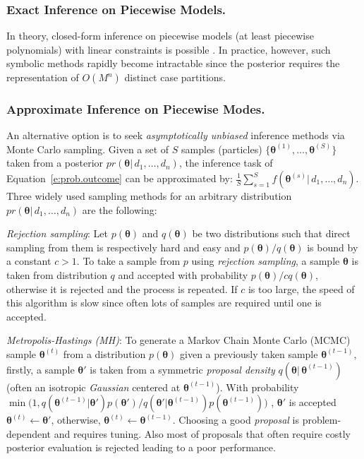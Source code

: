 \documentclass[letterpaper]{article}
\begin{document}
\subsubsection{Exact Inference on Piecewise Models.} In theory, closed-form inference on piecewise models (at least piecewise polynomials) with linear constraints is possible \cite{Sanner:12}.
In practice, however, such symbolic methods rapidly become intractable since the posterior requires
the representation of $O(M^n)$ distinct case partitions.
 
\subsubsection{Approximate Inference on Piecewise Modes.} 
An alternative option is to seek \emph{asymptotically unbiased} inference methods
via Monte Carlo sampling.
Given a set of $S$ samples (particles) $\{\boldsymbol\theta^{(1)}, \ldots, \boldsymbol\theta^{(S)}\}$ taken from a posterior $pr(\boldsymbol\theta | \, d_1, \ldots, d_n)$, 
the inference task of Equation~\ref{e:prob.outcome} can be approximated by: 
$\frac{1}{S} \sum_{s=1}^S f(\boldsymbol\theta^{(s)} | \, d_1, \ldots, d_n)$.
Three widely used sampling methods for an arbitrary distribution $pr(\boldsymbol\theta | \, d_1, \ldots, d_n)$ are the following:

\emph{Rejection sampling}:
Let $p(\boldsymbol{\theta})$ and $q(\boldsymbol{\theta})$ be two distributions 
such that direct sampling from them is respectively hard and easy
and
$p(\boldsymbol{\theta})/q(\boldsymbol{\theta})$ is bound by a constant $c>1$. 
To take a sample from $p$ using \emph{rejection sampling}, 
a sample $\boldsymbol{\theta}$ is taken from distribution $q$ and accepted with probability $p(\boldsymbol{\theta}) / c q(\boldsymbol{\theta})$, 
otherwise it is rejected and the process is repeated. 
If $c$ is too large, the speed of this algorithm is slow since often lots of samples are required until one is accepted.

\emph{Metropolis-Hastings (MH)}:
To generate a Markov Chain Monte Carlo (MCMC) 
sample $\boldsymbol{\theta}^{(t)}$ from a distribution $p(\boldsymbol{\theta})$ given a previously taken sample $\boldsymbol{\theta}^{(t-1)}$, 
firstly, a sample $\boldsymbol{\theta}'$ is taken 
from a symmetric \emph{proposal density} $q(\boldsymbol{\theta} |\, \boldsymbol{\theta}^{(t-1)})$ 
(often an isotropic \emph{Gaussian} centered at $\boldsymbol{\theta}^{(t-1)}$). 
With probability 
{\footnotesize
$\min \big(1, q(\boldsymbol{\theta}^{(t-1)}|\boldsymbol{\theta}')p(\boldsymbol{\theta}')/q(\boldsymbol{\theta}'|\boldsymbol{\theta}^{(t-1)})p(\boldsymbol{\theta}^{(t-1)}) \big)$
}, 
$\boldsymbol{\theta}'$ is accepted $\boldsymbol{\theta}^{(t)} \leftarrow \boldsymbol{\theta}'$, otherwise, $\boldsymbol{\theta}^{(t)} \leftarrow \boldsymbol{\theta}^{(t-1)}$. 
Choosing a good \emph{proposal} is problem-dependent and requires tuning. Also most of proposals that often require costly posterior evaluation is rejected leading to a poor performance. 
\end{document}
